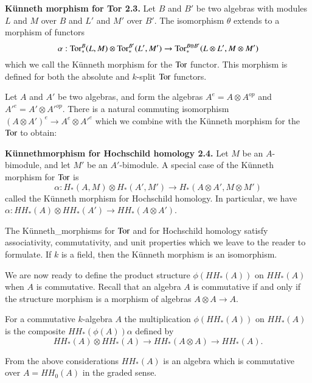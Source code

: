 \noindent
{\bf K\"unneth morphism for Tor 2.3.} Let $B$ and $B'$ be two algebras
with modules $L$ and $M$ over $B$ and $L'$ and $M'$ over $B'$. The
isomorphism $\theta$ extends to a morphism of functors 
$$
\alpha:\operatorname{Tor}^{B}_{\ast}(L,M)\otimes \operatorname{Tor}^{B'}_{\ast}(L',M')\to
\operatorname{Tor}^{B\otimes B'}_{\ast}(L\otimes L',M\otimes M')
$$
which we call the K\"unneth morphism for the $\operatorname{Tor}$ functor. This
morphism is defined for both the absolute and $k$-split $\operatorname{Tor}$
functors.

Let $A$ and $A'$ be two algebras, and form the algebras
$A^{e}=A\otimes A^{op}$ and ${A'}^{e}=A'\otimes {A'}^{op}$. There is a
natural commuting isomorphism $(A\otimes A')^{e}\to A^{e}\otimes
{A'}^{e}$ which we combine with the K\"unneth morphism for the $\operatorname{Tor}$
to obtain: 

\medskip
\noindent
{\bf K\"unneth\pageoriginale morphism for Hochschild homology
  2.4.}  
Let $M$ be an $A$-bimodule, and let $M'$ be an $A'$-bimodule. A
special case of the K\"unneth morphism for $\operatorname{Tor}$ is
$$
\alpha:H_{\ast}(A,M)\otimes H_{\ast}(A',M')\to H_{\ast}(A\otimes
A',M\otimes M')
$$
called the K\"unneth morphism for Hochschild homology. In particular,
we have $\alpha:HH_{\ast}(A)\otimes HH_{\ast}(A')\to
HH_{\ast}(A\otimes A')$. 

\setcounter{theorem}{4}
\begin{definition}\label{chap6-defi2.5}
The K\"unneth\_morphisms for $\operatorname{Tor}$ and for Hochschild homology
satisfy associativity, commutativity, and unit properties which we
leave to the reader to formulate. If $k$ is a field, then the
K\"unneth morphism is an isomorphism.
\end{definition}

We are now ready to define the product structure $\phi(HH_{\ast}(A))$
on $HH_{\ast}(A)$ when $A$ is commutative. Recall that an algebra $A$
is commutative if and only if the structure morphism is a morphism of
algebras $A\otimes A\to A$.

\begin{definition}\label{chap6-defi2.6}
For a commutative $k$-algebra $A$ the multiplication\break 
$\phi(HH_{\ast}(A))$ on $HH_{\ast}(A)$ is the composite
$HH_{\ast}(\phi(A))\alpha$ defined by
$$
HH_{\ast}(A)\otimes HH_{\ast}(A)\to HH_{\ast}(A\otimes A)\to
HH_{\ast}(A).
$$
\end{definition}

From the above considerations $HH_{\ast}(A)$ is an algebra which is
commutative over $A=HH_{0}(A)$ in the graded sense.

